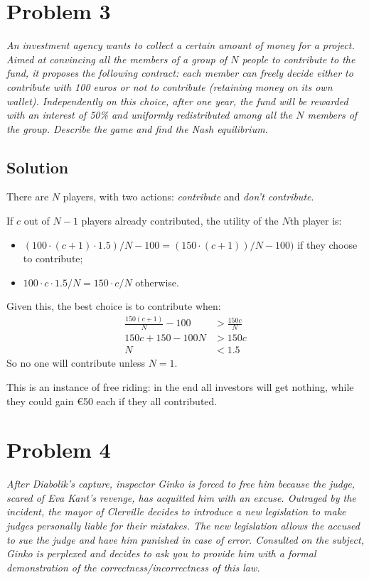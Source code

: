 \documentclass[a4paper, 12pt]{article}
\begin{document}
\section{Problem 3}
{\itshape
  An investment agency wants to collect a certain amount of money for a project.
Aimed at convincing all the members of a group of $N$ people to contribute to the
fund, it proposes the following contract: each member can freely decide either
to contribute with 100 euros or not to contribute (retaining money on its own
wallet). Independently on this choice, after one year, the fund will be rewarded
with an interest of 50\% and uniformly redistributed among all the $N$ members of
the group. Describe the game and find the Nash equilibrium.
}
\subsection{Solution}

There are \(N\) players, with two actions: \emph{contribute} and \emph{don't contribute}.

If \(c\) out of \(N-1\) players already contributed, the utility of the \(N\)th player is:
\begin{itemize}
\item \((100 \cdot (c + 1) \cdot 1.5) / N - 100 = (150 \cdot (c + 1))/ N - 100)\) if they choose to contribute;
\item \(100 \cdot c \cdot 1.5 / N = 150 \cdot c / N\) otherwise.
\end{itemize}

Given this, the best choice is to contribute when:
\begin{align*}
\frac{150 (c + 1)}{N} - 100 &> \frac{150 c}{N} \\
150c + 150 - 100 N &> 150 c \\
N &< 1.5
\end{align*}
So no one will contribute unless \(N=1\).

This is an instance of free riding: in the end all investors will get nothing, while they could gain €50 each if they all contributed.

\section{Problem 4}
{\itshape
After Diabolik's capture, inspector Ginko is forced to free him because the judge, scared of Eva Kant's revenge, has acquitted him with an excuse. Outraged by the incident, the mayor of Clerville decides to introduce a new legislation to make judges personally liable for their mistakes. The new legislation allows the accused to sue the judge and have him punished in case of error. Consulted on the subject, Ginko is perplexed and decides to ask you to provide him with a formal demonstration of the correctness/incorrectness of this law.
}
\end{document}
